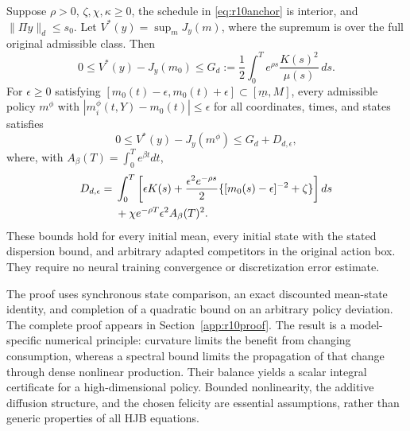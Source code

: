 \begin{theorem}\label{thm:r10tube}
Suppose $\rho>0$, $\zeta,\chi,\kappa\geq0$, the schedule in \eqref{eq:r10anchor} is interior, and $\|\Pi y\|_d\leq s_0$. Let $V^*(y)=\sup_m J_y(m)$, where the supremum is over the full original admissible class. Then
\begin{equation}\label{eq:r10anchorbound}
 0\leq V^*(y)-J_y(m_0)\leq
 G_d:=\frac12\int_0^T e^{\rho s}\frac{K(s)^2}{\mu(s)}\,ds.
\end{equation}
For $\epsilon\geq0$ satisfying
$[m_0(t)-\epsilon,m_0(t)+\epsilon]\subset[\underline m,M]$, every admissible policy $m^\phi$ with
$|m_i^\phi(t,Y)-m_0(t)|\leq\epsilon$ for all coordinates, times, and states satisfies
\begin{equation}\label{eq:r10neuralbound}
 0\leq V^*(y)-J_y(m^\phi)\leq G_d+D_{d,\epsilon},
\end{equation}
where, with $A_\beta(T)=\int_0^T e^{\beta t}dt$,
\begin{align}
 D_{d,\epsilon}={}&\int_0^T\left[\epsilon K(s)
 +\frac{\epsilon^2 e^{-\rho s}}2
       \{[m_0(s)-\epsilon]^{-2}+\zeta\}\right]ds\notag\\
 &+\chi e^{-\rho T}\epsilon^2 A_\beta(T)^2.\label{eq:r10tubeallowance}
\end{align}
These bounds hold for every initial mean, every initial state with the stated dispersion bound, and arbitrary adapted competitors in the original action box. They require no neural training convergence or discretization error estimate.
\end{theorem}

The proof uses synchronous state comparison, an exact discounted mean-state identity, and completion of a quadratic bound on an arbitrary policy deviation. The complete proof appears in Section~\ref{app:r10proof}. The result is a model-specific numerical principle: curvature limits the benefit from changing consumption, whereas a spectral bound limits the propagation of that change through dense nonlinear production. Their balance yields a scalar integral certificate for a high-dimensional policy. Bounded nonlinearity, the additive diffusion structure, and the chosen felicity are essential assumptions, rather than generic properties of all HJB equations.

